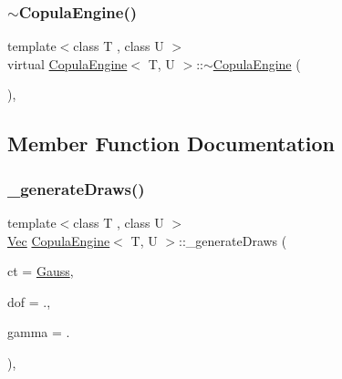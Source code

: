 \hypertarget{classCopulaEngine_aadcd0c2890899853db28a2269be09745}{}\label{classCopulaEngine_aadcd0c2890899853db28a2269be09745} 
\subsubsection{\texorpdfstring{$\sim$\+Copula\+Engine()}{~CopulaEngine()}}
{\footnotesize\ttfamily template$<$class T , class U $>$ \\
virtual \hyperlink{classCopulaEngine}{Copula\+Engine}$<$ T, U $>$\+::$\sim$\hyperlink{classCopulaEngine}{Copula\+Engine} (\begin{DoxyParamCaption}{ }\end{DoxyParamCaption})\hspace{0.3cm}{\ttfamily [inline]}, {\ttfamily [virtual]}}



\subsection{Member Function Documentation}
\hypertarget{classCopulaEngine_a9e74792c12cbe443f77221466b851aec}{}\label{classCopulaEngine_a9e74792c12cbe443f77221466b851aec} 
\subsubsection{\texorpdfstring{\+\_\+generate\+Draws()}{\_generateDraws()}}
{\footnotesize\ttfamily template$<$class T , class U $>$ \\
\hyperlink{compute__returns__eigen_8h_a1eb6a9306ef406d7975f3cbf2e247777}{Vec} \hyperlink{classCopulaEngine}{Copula\+Engine}$<$ T, U $>$\+::\+\_\+generate\+Draws (\begin{DoxyParamCaption}\item[{\hyperlink{rng_8h_aff2c6be1fded3d6d996b850e2eb87c25}{copula\+Type}}]{ct = {\ttfamily \hyperlink{rng_8h_aff2c6be1fded3d6d996b850e2eb87c25ab15a7891aa5223439e4692a1048cb220}{Gauss}},  }\item[{double}]{dof = {.},  }\item[{double}]{gamma = {.} }\end{DoxyParamCaption})\hspace{0.3cm}{\ttfamily [inline]}, {\ttfamily [protected]}}

